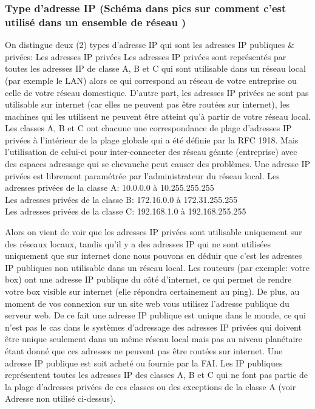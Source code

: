 \subsubsection{Type d’adresse IP (Schéma dans pics sur comment c’est utilisé dans un ensemble de réseau )}
On distingue deux (2) types d’adresse IP qui sont les adresses IP publiques \& privées:
Les adresses IP privées Les adresses IP privées sont représentés par toutes les
adresses IP de classe A, B et C qui sont utilisable dans un réseau local (par
exemple le LAN) alors ce qui correspond au réseau de votre entreprise ou celle
de votre réseau domestique. D’autre part, les adresses IP privées ne sont pas
utilisable sur internet (car elles ne peuvent pas être routées sur internet),
les machines qui les utilisent ne peuvent être atteint qu’à partir de votre
réseau local. Les classes A, B et C ont chacune une correspondance de plage
d’adresses IP privées à l’intérieur de la plage globale qui a été définie par
la RFC 1918. Mais l’utilisation  de celui-ci pour inter-connecter des réseau
géante (entreprise) avec des espaces adressage qui se chevauche peut causer des
problèmes. Une adresse IP privées est librement paramétrée par l’administrateur
du réseau local.
\vspace{1cm}
Les adresses privées de la classe A: 10.0.0.0 à 10.255.255.255\\
Les adresses privées de la classe B: 172.16.0.0 à 172.31.255.255\\
Les adresses privées de la classe C: 192.168.1.0 à 192.168.255.255\\
\vspace{1cm}

Alors on vient de voir que les adresses IP privées sont utilisable uniquement
sur des réseaux locaux, tandis qu’il y a des adresses IP qui ne sont utilisées
uniquement que sur internet donc nous pouvons en déduir que c’est les adresses
IP publiques non utilisable dans un réseau local. Les routeurs (par exemple:
votre box) ont une adresse IP publique du côté d’internet, ce qui permet de
rendre votre box visible sur internet (elle répondra certainement au ping). De
plus, au moment de vos connexion sur un site web vous utilisez l’adresse
publique du serveur web. De ce fait une adresse IP publique est unique dans le
monde, ce qui n’est pas le cas dans le systèmes d’adressage des adresses IP
privées qui doivent être unique seulement dans un même réseau local mais pas au
niveau planétaire étant donné que ces adresses ne peuvent pas être routées sur
internet. Une adresse IP publique est soit acheté ou fournie par la FAI.  Les
IP publiques représentent toutes les adresses IP des classes A, B et C qui ne
font pas partie de la plage d’adresses privées de ces classes ou des exceptions
de la classe A (voir Adresse non utilisé ci-dessus).


